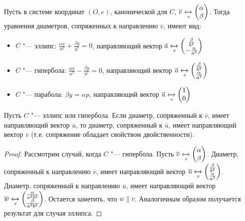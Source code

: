 \begin{note}
	Пусть в системе координат $(O, e)$, канонической для $C$, $\overline{v} \xleftrightarrow[e]{} \begin{pmatrix}\alpha\\\beta\end{pmatrix}$. Тогда уравнения диаметров, сопряженных к направлению $\overline{v}$, имеют вид:
	\begin{itemize}
		\item $C$ "--- эллипс: $\frac{\alpha x}{a^2} + \frac{\beta y}{b^2} = 0$, направляющий вектор $\overline{a} \xleftrightarrow[e]{} \begin{pmatrix}\frac{\beta}{b^2}\\-\frac{\alpha}{a^2}\end{pmatrix}$
		\item $C$ "--- гипербола: $\frac{\alpha x}{a^2} - \frac{\beta y}{b^2} = 0$, направляющий вектор $\overline{a} \xleftrightarrow[e]{} \begin{pmatrix}\frac{\beta}{b^2}\\\frac{\alpha}{a^2}\end{pmatrix}$
		\item $C$ "--- парабола: $\beta y = \alpha p$, направляющий вектор $\overline{a} \xleftrightarrow[e]{} \begin{pmatrix}1\\0\end{pmatrix}$
	\end{itemize}
\end{note}

\begin{proposition}
	Пусть $C$ "--- эллипс или гипербола. Если диаметр, сопряженный к $\overline{v}$, имеет направляющий вектор $\overline{u}$, то диаметр, сопряженный к $\overline{u}$, имеет направляющий вектор $\overline{v}$ (т.\:е. сопряжение обладает свойством двойственности).
\end{proposition}

\begin{proof}
	Рассмотрим случай, когда $C$ "--- гипербола. Пусть $\overline{v} \xleftrightarrow[e]{} \begin{pmatrix}\alpha\\\beta\end{pmatrix}$. Диаметр, сопряженный к направлению $\overline{v}$, имеет направляющий вектор $\overline{u} \xleftrightarrow[e]{} \begin{pmatrix}\frac{\beta}{b^2}\\\frac{\alpha}{a^2}\end{pmatrix}$. Диаметр, сопряженный к направлению $\overline{u}$, имеет направляющий вектор $\overline{w} \xleftrightarrow[e]{} \begin{pmatrix}\frac{\alpha}{a^2b^2}\\\frac{\beta}{a^2b^2}\end{pmatrix}$. Остается заметить, что $\overline{w} \parallel \overline{v}$. Аналогичным образом получается результат для случая эллипса.
\end{proof}

